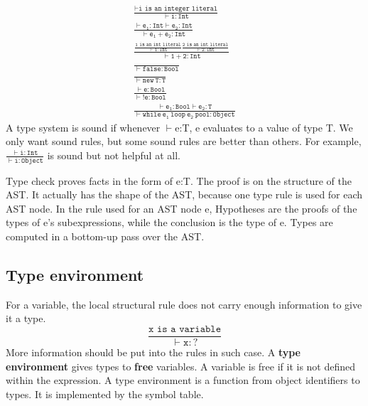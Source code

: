 \begin{gather*}
\mathtt{\frac{\vdash\texttt{i is an integer literal}}{\vdash i:Int}}\\
\mathtt{\frac{\vdash e_1: Int\vdash e_2: Int}{\vdash e_1+e_2:Int}}\\
\mathtt{\frac{\frac{\text{1 is an int literal}}{\vdash 1:Int}\frac{\text{2 is an int literal}}{\vdash 2:Int}}{\vdash 1+2:Int}}\\
\mathtt{\frac{}{\vdash false : Bool}}\\
\mathtt{\frac{}{\vdash new\:T : T}}\\
\mathtt{\frac{\vdash e:Bool}{\vdash!e:Bool}}\\
\mathtt{\frac{\vdash e_1:Bool\vdash e_2: T}{\vdash while\:e_1\:loop\:e_2\:pool:Object}}
\end{gather*}
A type system is sound if whenever $\vdash$e:T, e evaluates to a value of type T. We only want sound rules, but some sound rules are better than others. For example, $\mathtt{\frac{\vdash i:Int}{\vdash i:Object}}$ is sound but not helpful at all.

Type check proves facts in the form of e:T. The proof is on the structure of the AST. It actually has the shape of the AST, because one type rule is used for each AST node. In the rule used for an AST node e, Hypotheses are the proofs of the types of e's subexpressions, while the conclusion is the type of e. Types are computed in a bottom-up pass over the AST.
\subsection{Type environment}
For a variable, the local structural rule does not carry enough information to give it a type. 
\begin{equation*}
\mathtt{\frac{\text{x is a variable}}{\vdash x : ?}}
\end{equation*}
More information should be put into the rules in such case. A {\bf type environment} gives types to {\bf free} variables. A variable is free if it is not defined within the expression. A type environment is a function from object identifiers to types. It is implemented by the symbol table.


